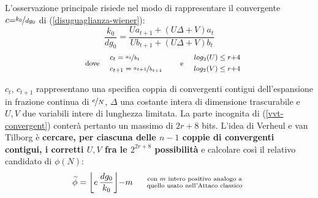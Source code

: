 \documentclass[twoside,symmetric,justified,openany,nobib]{tufte-book}
\def\P#1{_{\text{\tiny $#1$}}}
\begin{document}
L'osservazione principale risiede nel modo di rappresentare il convergente $c{=}\nicefrac{k_0}{dg_0}$ di (\ref{disuguaglianza-wiener}):
\begin{equation}
  \label{vvt-convergent}
  \frac{k_0}{dg_0} = \frac{Ua_{t+1}+(U\Delta{+}V)a_t}{Ub_{t+1}+(U\Delta{+}V)b_t}
\end{equation}
\[
  \text{\footnotesize dove}
  \hspace{12pt}{\footnotesize\begin{split}
    &c_t = \nicefrac{a_t}{b_t}\\
    &c_{t+1} = \nicefrac{a_{t+1}}{b_{t+1}}
  \end{split}}
  \hspace{12pt}\text{\footnotesize e}
  \hspace{12pt}{\footnotesize\begin{split}
    log\P{2}(U) \leq r{+}4\\
    log\P{2}(V) \leq r{+}4
  \end{split}}
\]

\medskip
\noindent
$c_t$, $c_{t+1}$ rappresentano una specifica coppia di convergenti contigui dell'espansione in frazione continua di $\nicefrac{e}{N}$, $\Delta$ una costante intera di dimensione trascurabile e $U,V$ due variabili intere di lunghezza limitata.
La parte incognita di (\ref{vvt-convergent}) conterà pertanto un massimo di $2r{+}8$ bits. L'idea di Verheul e van Tilborg è \textbf{cercare, per ciascuna delle \boldmath$n{-}1$ coppie di convergenti contigui, i corretti \boldmath$U,V$ fra le \boldmath$2^{2r+8}$ possibilità} e calcolare così il relativo candidato di $\phi(N)$:
\[
  \widetilde{\phi} = \biggl\lfloor e\,\frac{dg_0}{k_0}\biggr\rfloor {-} m
  \hspace{12pt}\text{\begin{minipage}[c]{0.35\linewidth}\scriptsize\centering con $m$ intero positivo analogo a quello usato nell'Attaco classico\end{minipage}}
\]
\end{document}
